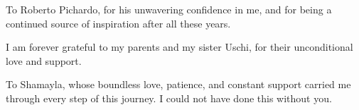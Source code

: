 \begin{acknowledgements}
    To Roberto Pichardo, for his unwavering confidence in me, and for being a continued source of inspiration after all these years.

    I am forever grateful to my parents and my sister Uschi, for their unconditional love and support.

    To Shamayla, whose boundless love, patience, and constant support carried me through every step of this journey.
    I could not have done this without you.

    \begingroup
    \def\thefootnote{}%
    \addtocounter{footnote}{-1}%
    \endgroup
\end{acknowledgements}
